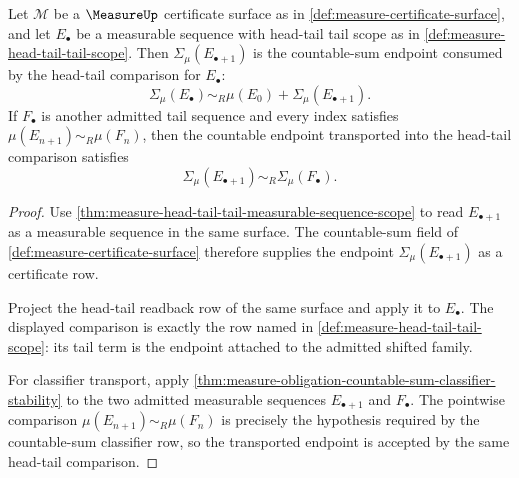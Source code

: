 \begin{theorem}
\label{thm:measure-head-tail-tail-countable-sum-scope}
Let $\mathcal{M}$ be a $\MeasureUp$ certificate surface as in
\autoref{def:measure-certificate-surface}, and let $E_\bullet$ be a measurable
sequence with head-tail tail scope as in
\autoref{def:measure-head-tail-tail-scope}. Then
$\Sigma_\mu(E_{\bullet+1})$ is the countable-sum endpoint consumed by the
head-tail comparison for $E_\bullet$:
$$
\Sigma_\mu(E_\bullet)\sim_R\mu(E_0)+\Sigma_\mu(E_{\bullet+1}).
$$
If $F_\bullet$ is another admitted tail sequence and every index satisfies
$\mu(E_{n+1})\sim_R\mu(F_n)$, then the countable endpoint transported into the
head-tail comparison satisfies
$$
\Sigma_\mu(E_{\bullet+1})\sim_R\Sigma_\mu(F_\bullet).
$$
\end{theorem}
\begin{proof}
Use \autoref{thm:measure-head-tail-tail-measurable-sequence-scope} to read
$E_{\bullet+1}$ as a measurable sequence in the same surface. The countable-sum
field of \autoref{def:measure-certificate-surface} therefore supplies the
endpoint $\Sigma_\mu(E_{\bullet+1})$ as a certificate row.

Project the head-tail readback row of the same surface and apply it to
$E_\bullet$. The displayed comparison is exactly the row named in
\autoref{def:measure-head-tail-tail-scope}: its tail term is the endpoint
attached to the admitted shifted family.

For classifier transport, apply
\autoref{thm:measure-obligation-countable-sum-classifier-stability} to the two
admitted measurable sequences $E_{\bullet+1}$ and $F_\bullet$. The pointwise
comparison $\mu(E_{n+1})\sim_R\mu(F_n)$ is precisely the hypothesis required by
the countable-sum classifier row, so the transported endpoint is accepted by the
same head-tail comparison.
\end{proof}

